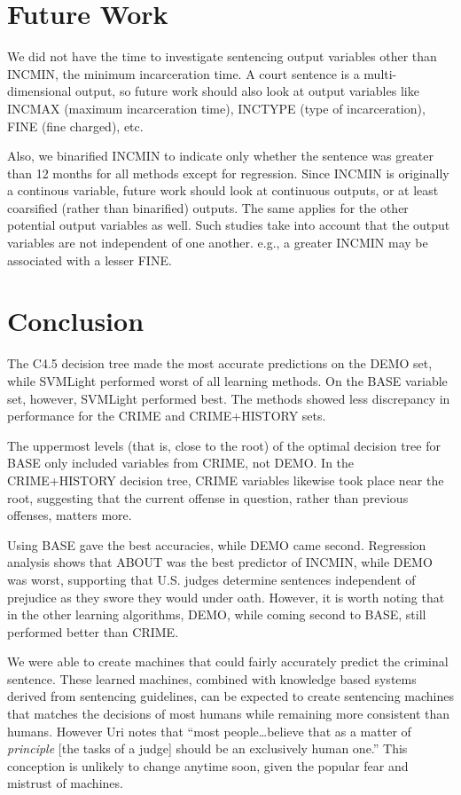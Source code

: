\documentclass[11pt,letter]{article}
\begin{document}
\section{Future Work}
We did not have the time to investigate sentencing output variables other than INCMIN, the minimum incarceration time. A court sentence is a multi-dimensional output, so future work should also look at output variables like INCMAX (maximum incarceration time), INCTYPE (type of incarceration), FINE (fine charged), etc.

Also, we binarified INCMIN to indicate only whether the sentence was greater than 12 months for all methods except for regression. Since INCMIN is originally a continous variable, future work should look at continuous outputs, or at least coarsified (rather than binarified) outputs. The same applies for the other potential output variables as well. Such studies take into account that the output variables are not independent of one another. e.g., a greater INCMIN may be associated with a lesser FINE. 

\section{Conclusion}
The C4.5 decision tree made the most accurate predictions on the DEMO set, while SVMLight performed worst of all learning methods. On the BASE variable set, however, SVMLight performed best. The methods showed less discrepancy in performance for the CRIME and CRIME+HISTORY sets. 

The uppermost levels (that is, close to the root) of the optimal decision tree for BASE only included variables from CRIME, not DEMO. In the CRIME+HISTORY decision tree, CRIME variables likewise took place near the root, suggesting that the current offense in question, rather than previous offenses, matters more. 

Using BASE gave the best accuracies, while DEMO came second. Regression analysis shows that ABOUT was the best predictor of INCMIN, while DEMO was worst, supporting that U.S. judges determine sentences independent of prejudice as they swore they would under oath. However, it is worth noting that in the other learning algorithms, DEMO, while coming second to BASE, still performed better than CRIME. 

We were able to create machines that could fairly accurately predict the criminal sentence. These learned machines, combined with knowledge based systems derived from sentencing guidelines, can be expected to create sentencing machines that matches the decisions of most humans while remaining more consistent than humans. However Uri notes that ``most people\ldots believe that as a matter of \emph{principle} [the tasks of a judge] should be an exclusively human one.'' This conception is unlikely to change anytime soon, given the popular fear and mistrust of machines. 
\end{document}
